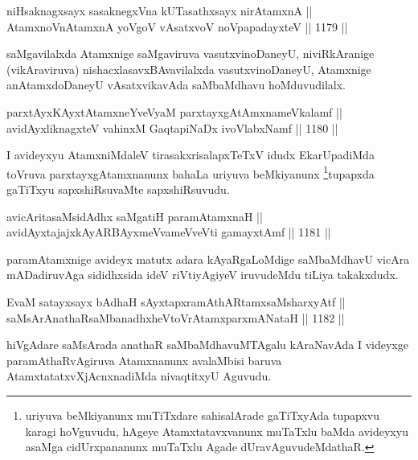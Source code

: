 \begin{shl}
niHsaknagxsayx sasaknegxVna kUTasathxsayx nirAtamxnA || \\
AtamxnoV\s nAtamxnA yoVgoV vAsatxvoV noVpapadayxteV ||  1179 ||  
\end{shl}

\begin{artha}
saMgavilalxda Atamxnige saMgaviruva vasutxvinoDaneyU, niviRkAranige (vikAraviruva) nishacxlasavxBAvavilalxda vasutxvinoDaneyU, Atamxnige anAtamxdoDaneyU vAsatxvikavAda saMbaMdhavu hoMduvudilalx.
\end{artha}


\begin{shl}
parxtAyxKAyxtA\s \s tamxneYveVyaM parxtayxgAtAmxnameVkalamf || \\
avidAyx\s \s liknagxteV vahinxM GaqtapiNaDx ivoVlabxNamf ||  1180 ||  
\end{shl}

\begin{artha}
I avideyxyu AtamxniMdaleV tirasakxrisalapxTeTxV idudx EkarUpadiMda toVruva parxtayxgAtamxnanunx bahaLa uriyuva beMkiyanunx \footnote{uriyuva beMkiyanunx muTiTxdare sahisalArade gaTiTxyAda tupapxvu karagi hoVguvudu, hAgeye Atamxtatavxvanunx muTaTxlu baMda avideyxyu asaMga cidUrxpananunx muTaTxlu Agade dUravAguvudeMdathaR.}tupapxda gaTiTxyu sapxshiRsuvaMte sapxshiRsuvudu.
\end{artha}

\begin{shl}
avicAritasaMsidAdhx saMgatiH paramAtamxnaH || \\
avidAyxtajajxkAyARBAyxmeVvameVveVti gamayxtAmf ||  1181 ||  
\end{shl}

\begin{artha}
paramAtamxnige avideyx matutx adara kAyaRgaLoMdige saMbaMdhavU vicAra mADadiruvAga sididhxsida ideV riVtiyAgiyeV iruvudeMdu tiLiya takakxdudx.
\end{artha}

\begin{shl}
EvaM satayxsayx bAdhaH sAyxtapxramAthARtamxsaMsharxyAtf || \\
saMsArAnathaRsaMbanadhxheVtoVrAtamxparxmANataH ||  1182 ||  
\end{shl}

\begin{artha}
hiVgAdare saMsArada anathaR saMbaMdhavuMTAgalu kAraNavAda I videyxge paramAthaRvAgiruva Atamxnanunx avalaMbisi baruva AtamxtatatxvXjAcnxnadiMda nivaqtitxyU Aguvudu.
\end{artha}

